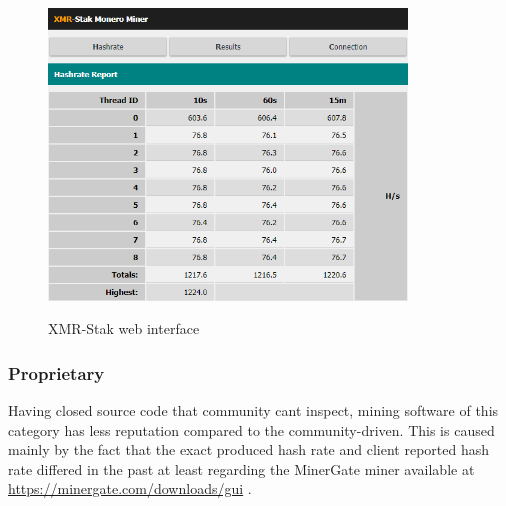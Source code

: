 \documentclass[
  printed, %
  table,   %
  nolof,     %
  nolot,     %
           oneside, color
]{fithesis3}
\begin{document}
\begin{figure}[H]
\begin{center}

    \vspace{-0.8em}
 \includegraphics[trim={0 0 0 0},clip,width=0.85\textwidth]{Screenshot_9.png}
    \caption{XMR-Stak web interface}
    \vspace{-1.5em}
    \label{pic:withoutresdrawable}
\end{center}
    \end{figure}
    
\subsubsection{Proprietary}
Having closed source code that community cant inspect, mining software of this category has less reputation compared to the community-driven. This is caused mainly by the fact that the exact produced hash rate and client reported hash rate differed in the past at least regarding the MinerGate miner available at \url{https://minergate.com/downloads/gui} .
\iffalse
\end{document}
